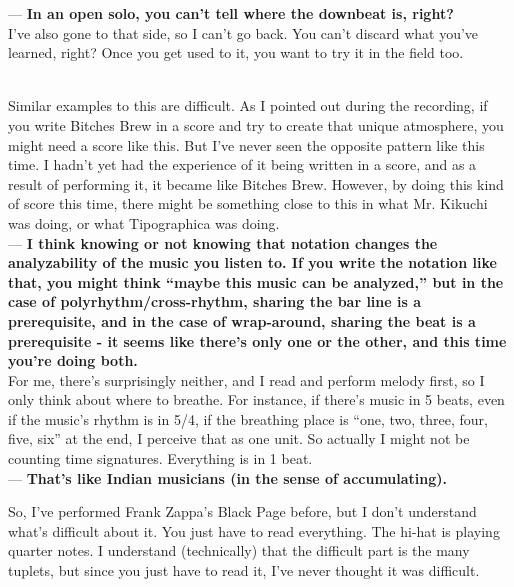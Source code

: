 \begin{description}
--- {\bf In an open solo, you can't tell where the downbeat is, right?}\\

I've also gone to that side, so I can't go back. You can't discard what you've learned, right? Once you get used to it, you want to try it in the field too.\\

\item [Have you experienced any similar music before?]\mbox{}\\

Similar examples to this are difficult. As I pointed out during the recording, if you write Bitches Brew in a score and try to create that unique atmosphere, you might need a score like this. But I've never seen the opposite pattern like this time. I hadn't yet had the experience of it being written in a score, and as a result of performing it, it became like Bitches Brew. However, by doing this kind of score this time, there might be something close to this in what Mr. Kikuchi was doing, or what Tipographica was doing.\\

--- {\bf I think knowing or not knowing that notation changes the analyzability of the music you listen to. If you write the notation like that, you might think ``maybe this music can be analyzed,'' but in the case of polyrhythm/cross-rhythm, sharing the bar line is a prerequisite, and in the case of wrap-around, sharing the beat is a prerequisite - it seems like there's only one or the other, and this time you're doing both.}\\

For me, there's surprisingly neither, and I read and perform melody first, so I only think about where to breathe. For instance, if there's music in 5 beats, even if the music's rhythm is in 5/4, if the breathing place is ``one, two, three, four, five, six'' at the end, I perceive that as one unit. So actually I might not be counting time signatures. Everything is in 1 beat.\\

--- {\bf That's like Indian musicians (in the sense of accumulating).}

So, I've performed Frank Zappa's Black Page before, but I don't understand what's difficult about it. You just have to read everything. The hi-hat is playing quarter notes. I understand (technically) that the difficult part is the many tuplets, but since you just have to read it, I've never thought it was difficult.\\


\end{description}
